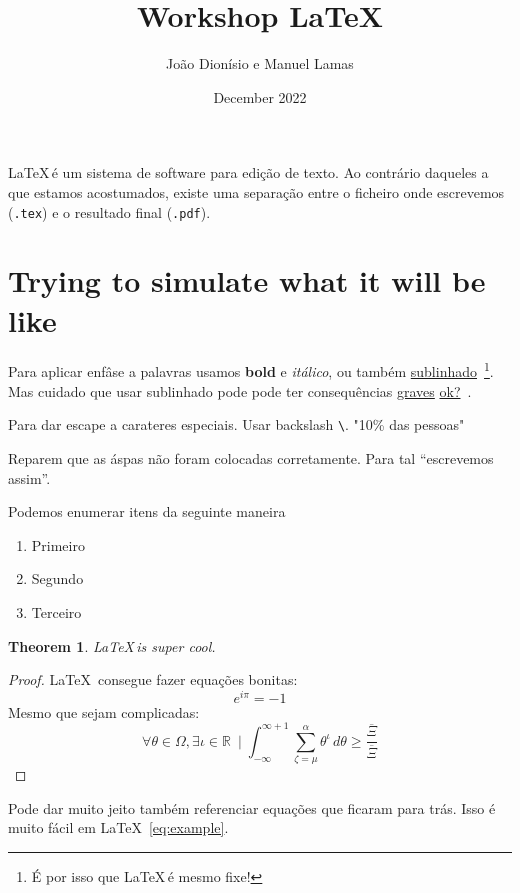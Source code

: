 \documentclass[10pt]{article}
\title{Workshop \LaTeX}
\author{João Dionísio e Manuel Lamas}
\date{December 2022}
\newtheorem{theorem}{Theorem}
\newcommand{\R}{\mathbb{R}}
\begin{document}
\maketitle
    
\LaTeX\,é um sistema de software para edição de texto. Ao contrário daqueles a que estamos acostumados, existe uma separação entre o ficheiro onde escrevemos (\verb|.tex|) e o resultado final (\verb|.pdf|).

\section{Trying to simulate what it will be like}



Para aplicar enfâse a palavras usamos \textbf{bold} e \emph{itálico}, ou também \underline{sublinhado}~\footnote{É por isso que \LaTeX\,é mesmo fixe!}. Mas cuidado que usar sublinhado pode pode ter consequências \underline{graves} \underline{ok?}~\cite{how_to_cite_stuff}.

Para dar escape a carateres especiais. Usar backslash \verb|\|.
"10\% das pessoas"

Reparem que as áspas não foram colocadas corretamente. Para tal ``escrevemos assim''.

Podemos enumerar itens da seguinte maneira
\begin{enumerate}
    \item Primeiro
    \item Segundo
    \item Terceiro
\end{enumerate}

\begin{theorem}
    \LaTeX\,is super cool.
\end{theorem}
\begin{proof}
\LaTeX\, consegue fazer equações bonitas:
\begin{equation} %
    e^{i\pi} = -1
\end{equation}
Mesmo que sejam complicadas:
\begin{equation} \label{eq:example}
    \forall \theta \in \Omega, \exists \iota \in \R~\mid \int_{-\infty}^{\infty+1}\sum_{\zeta=\mu}^{\alpha} \theta^{\iota} \, d\theta \geq \frac{\overline{\Xi}}{\overline{\Xi}} 
\end{equation}

\end{proof}

Pode dar muito jeito também referenciar equações que ficaram para trás. Isso é muito fácil em \LaTeX~\ref{eq:example}.
\end{document}
